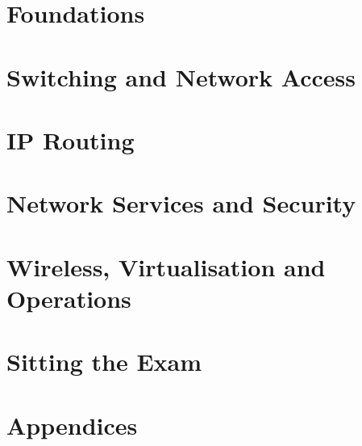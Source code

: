 \documentclass[11pt,a4paper,oneside]{report}
\begin{document}


\part{Foundations}









\part{Switching and Network Access}









\part{IP Routing}







\part{Network Services and Security}









\part{Wireless, Virtualisation and Operations}








\part{Sitting the Exam}




\appendix
\part*{Appendices}







\end{document}
